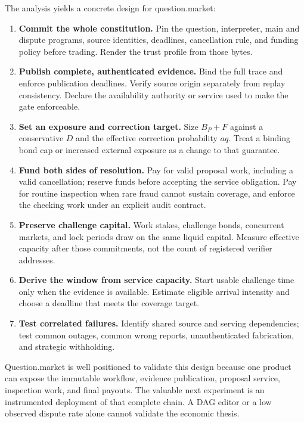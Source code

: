 \documentclass[10pt]{article}
\begin{document}
The analysis yields a concrete design for question.market:
\begin{enumerate}
\item \textbf{Commit the whole constitution.} Pin the question, interpreter, main and dispute programs, source identities, deadlines, cancellation rule, and funding policy before trading. Render the trust profile from those bytes.
\item \textbf{Publish complete, authenticated evidence.} Bind the full trace and enforce publication deadlines. Verify source origin separately from replay consistency. Declare the availability authority or service used to make the gate enforceable.
\item \textbf{Set an exposure and correction target.} Size $B_P+F$ against a conservative $D$ and the effective correction probability $aq$. Treat a binding bond cap or increased external exposure as a change to that guarantee.
\item \textbf{Fund both sides of resolution.} Pay for valid proposal work, including a valid cancellation; reserve funds before accepting the service obligation. Pay for routine inspection when rare fraud cannot sustain coverage, and enforce the checking work under an explicit audit contract.
\item \textbf{Preserve challenge capital.} Work stakes, challenge bonds, concurrent markets, and lock periods draw on the same liquid capital. Measure effective capacity after those commitments, not the count of registered verifier addresses.
\item \textbf{Derive the window from service capacity.} Start usable challenge time only when the evidence is available. Estimate eligible arrival intensity and choose a deadline that meets the coverage target.
\item \textbf{Test correlated failures.} Identify shared source and serving dependencies; test common outages, common wrong reports, unauthenticated fabrication, and strategic withholding.
\end{enumerate}

Question.market is well positioned to validate this design because one product can expose the immutable workflow, evidence publication, proposal service, inspection work, and final payouts. The valuable next experiment is an instrumented deployment of that complete chain. A DAG editor or a low observed dispute rate alone cannot validate the economic thesis.
\end{document}
